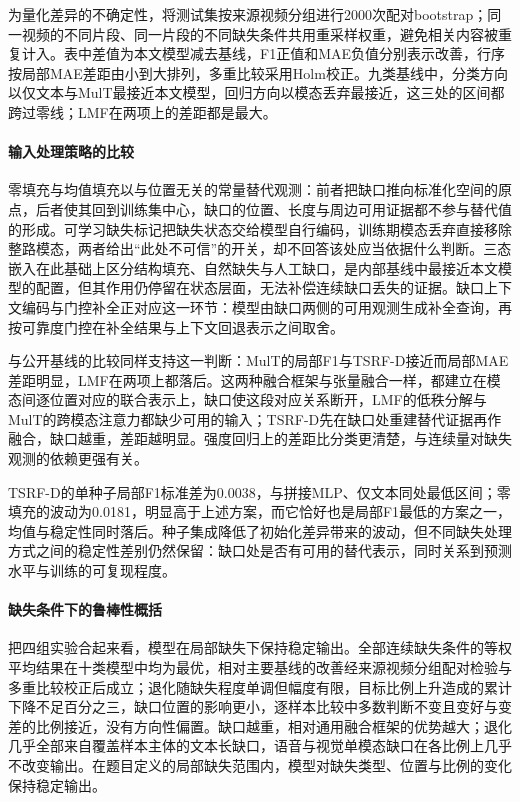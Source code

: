 \begin{samepage}
为量化差异的不确定性，将测试集按来源视频分组进行2000次配对bootstrap；同一视频的不同片段、同一片段的不同缺失条件共用重采样权重，避免相关内容被重复计入。表中差值为本文模型减去基线，F1正值和MAE负值分别表示改善，行序按局部MAE差距由小到大排列，多重比较采用Holm校正。九类基线中，分类方向以仅文本与MulT最接近本文模型，回归方向以模态丢弃最接近，这三处的区间都跨过零线；LMF在两项上的差距都是最大。\par\end{samepage}


\paragraph{输入处理策略的比较}
零填充与均值填充以与位置无关的常量替代观测：前者把缺口推向标准化空间的原点，后者使其回到训练集中心，缺口的位置、长度与周边可用证据都不参与替代值的形成。可学习缺失标记把缺失状态交给模型自行编码，训练期模态丢弃直接移除整路模态，两者给出“此处不可信”的开关，却不回答该处应当依据什么判断。三态嵌入在此基础上区分结构填充、自然缺失与人工缺口，是内部基线中最接近本文模型的配置，但其作用仍停留在状态层面，无法补偿连续缺口丢失的证据。缺口上下文编码与门控补全正对应这一环节：模型由缺口两侧的可用观测生成补全查询，再按可靠度门控在补全结果与上下文回退表示之间取舍。

与公开基线的比较同样支持这一判断：MulT\cite{ref:mtfn}的局部F1与TSRF-D接近而局部MAE差距明显，LMF\cite{ref:lmf}在两项上都落后。这两种融合框架与张量融合\cite{ref:tfn}一样，都建立在模态间逐位置对应的联合表示上，缺口使这段对应关系断开，LMF的低秩分解与MulT的跨模态注意力都缺少可用的输入；TSRF-D先在缺口处重建替代证据再作融合，缺口越重，差距越明显。强度回归上的差距比分类更清楚，与连续量对缺失观测的依赖更强有关。


TSRF-D的单种子局部F1标准差为0.0038，与拼接MLP、仅文本同处最低区间；零填充的波动为0.0181，明显高于上述方案，而它恰好也是局部F1最低的方案之一，均值与稳定性同时落后。种子集成降低了初始化差异带来的波动，但不同缺失处理方式之间的稳定性差别仍然保留：缺口处是否有可用的替代表示，同时关系到预测水平与训练的可复现程度。

\paragraph{缺失条件下的鲁棒性概括}

把四组实验合起来看，模型在局部缺失下保持稳定输出。全部连续缺失条件的等权平均结果在十类模型中均为最优，相对主要基线的改善经来源视频分组配对检验与多重比较校正后成立；退化随缺失程度单调但幅度有限，目标比例上升造成的累计下降不足百分之三，缺口位置的影响更小，逐样本比较中多数判断不变且变好与变差的比例接近，没有方向性偏置。缺口越重，相对通用融合框架的优势越大；退化几乎全部来自覆盖样本主体的文本长缺口，语音与视觉单模态缺口在各比例上几乎不改变输出。在题目定义的局部缺失范围内，模型对缺失类型、位置与比例的变化保持稳定输出。

